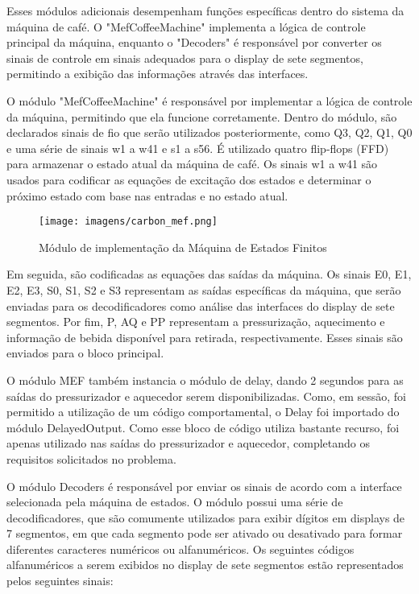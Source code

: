 Esses módulos adicionais desempenham funções específicas dentro do sistema da máquina de café. O "MefCoffeeMachine" implementa a lógica de controle principal da máquina, enquanto o "Decoders" é responsável por converter os sinais de controle em sinais adequados para o display de sete segmentos, permitindo a exibição das informações através das interfaces.

O módulo "MefCoffeeMachine" é responsável por implementar a lógica de controle da máquina, permitindo que ela funcione corretamente. Dentro do módulo, são declarados sinais de fio que serão utilizados posteriormente, como Q3, Q2, Q1, Q0 e uma série de sinais w1 a w41 e s1 a s56. É utilizado quatro flip-flops (FFD) para armazenar o estado atual da máquina de café. Os sinais w1 a w41 são usados para codificar as equações de excitação dos estados e determinar o próximo estado com base nas entradas e no estado atual.

\begin{figure}[!h]
    \centering
    \texttt{[image: imagens/carbon\_mef.png]}
    \caption{Módulo de implementação da Máquina de Estados Finitos}
    \label{fig:carbon_mef}
\end{figure}

Em seguida, são codificadas as equações das saídas da máquina. Os sinais E0, E1, E2, E3, S0, S1, S2 e S3 representam as saídas específicas da máquina, que serão enviadas para os decodificadores como análise das interfaces do display de sete segmentos. Por fim, P, AQ e PP representam a pressurização, aquecimento e informação de bebida disponível para retirada, respectivamente. Esses sinais são enviados para o bloco principal.

O módulo MEF também instancia o módulo de delay, dando 2 segundos para as saídas do pressurizador e aquecedor serem disponibilizadas. Como, em sessão, foi permitido a utilização de um código comportamental, o Delay foi importado do módulo DelayedOutput. Como esse bloco de código utiliza bastante recurso, foi apenas utilizado nas saídas do pressurizador e aquecedor, completando os requisitos solicitados no problema. 

O módulo Decoders é responsável por enviar os sinais de acordo com a interface selecionada pela máquina de estados. O módulo possui uma série de decodificadores, que são comumente utilizados para exibir dígitos em displays de 7 segmentos, em que cada segmento pode ser ativado ou desativado para formar diferentes caracteres numéricos ou alfanuméricos. Os seguintes códigos alfanuméricos a serem exibidos no display de sete segmentos estão representados pelos seguintes sinais:

